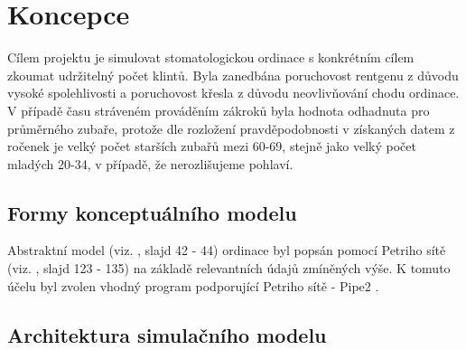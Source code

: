\documentclass[a4paper,11pt,titlepage]{article}
\begin{document}
\section{Koncepce}

Cílem projektu je simulovat stomatologickou ordinace s konkrétním cílem zkoumat udržitelný počet klintů. Byla zanedbána poruchovost rentgenu z důvodu vysoké spolehlivosti a poruchovost křesla z důvodu neovlivňování chodu ordinace. V případě času stráveném prováděním zákroků byla hodnota odhadnuta pro průměrného zubaře, protože dle rozložení pravděpodobnosti v získaných datem z ročenek \cite{ceskastomatologickakomorarocenky} je velký počet starších zubařů mezi 60-69, stejně jako velký počet mladých 20-34, v případě, že nerozlišujeme pohlaví.

\subsection{Formy konceptuálního modelu}

Abstraktní model (viz. \cite{ims}, slajd 42 - 44) ordinace byl popsán pomocí Petriho sítě (viz. \cite{ims}, slajd 123 - 135) na základě relevantních údajů zmíněných výše. K tomuto účelu byl zvolen vhodný program podporující Petriho sítě - Pipe2 \cite{pipe2}.

\subsection{Architektura simulačního modelu}
\end{document}
